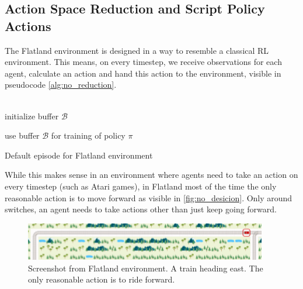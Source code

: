 \subsection*{Action Space Reduction and Script Policy Actions}\label{reduced_action_space}
The Flatland environment is designed in a way to resemble a classical RL environment. This means, on every timestep, we receive observations for each agent, calculate an action and hand this action to the environment, visible in pseudocode \autoref{alg:no_reduction}.\\\\
\begin{algorithm}[H]
	initialize buffer $\mathcal{B}$\\

	use buffer $\mathcal{B}$ for training of policy $\pi$
	\caption{Default episode for Flatland environment}
	\label{alg:no_reduction}
\end{algorithm}
While this makes sense in an environment where agents need to take an action on every timestep (such as Atari games), in Flatland most of the time the only reasonable action is to move forward as visible in \autoref{fig:no_desicion}. Only around switches, an agent needs to take actions other than just keep going forward.
\begin{figure}[H]
	\centering
	\includegraphics[width=300pt]{images/screenshot_no_decision.png}
	\caption{Screenshot from Flatland environment. A train heading east. The only reasonable action is to ride forward.}
	\label{fig:no_desicion}
\end{figure}
